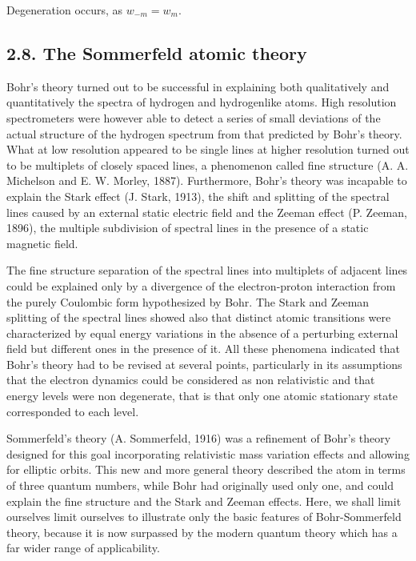 \documentclass{article}
\begin{document}
Degeneration occurs, as $w_{-m}=w_{m}$.

\subsection*{2.8. The Sommerfeld atomic theory}

Bohr's theory turned out to be successful in explaining both qualitatively and quantitatively the spectra of hydrogen and hydrogenlike atoms. High resolution spectrometers were however able to detect a series of small deviations of the actual structure of the hydrogen spectrum from that predicted by Bohr's theory. What at low resolution appeared to be single lines at higher resolution turned out to be multiplets of closely spaced lines, a phenomenon called fine structure (A. A. Michelson and E. W. Morley, 1887). Furthermore, Bohr's theory was incapable to explain the Stark effect (J. Stark, 1913), the shift and splitting of the spectral lines caused by an external static electric field and the Zeeman effect (P. Zeeman, 1896), the multiple subdivision of spectral lines in the presence of a static magnetic field.

The fine structure separation of the spectral lines into multiplets of adjacent lines could be explained only by a divergence of the electron-proton interaction from the purely Coulombic form hypothesized by Bohr. The Stark and Zeeman splitting of the spectral lines showed also that distinct atomic transitions were characterized by equal energy variations in the absence of a perturbing external field but different ones in the presence of it. All these phenomena indicated that Bohr's theory had to be revised at several points, particularly in its assumptions that the electron dynamics could be considered as non relativistic and that energy levels were non degenerate, that is that only one atomic stationary state corresponded to each level.

Sommerfeld's theory (A. Sommerfeld, 1916) was a refinement of Bohr's theory designed for this goal incorporating relativistic mass variation effects and allowing for elliptic orbits. This new and more general theory described the atom in terms of three quantum numbers, while Bohr had originally used only one, and could explain the fine structure and the Stark and Zeeman effects. Here, we shall limit
ourselves limit ourselves to illustrate only the basic features of Bohr-Sommerfeld theory, because it is now surpassed by the modern quantum theory which has a far wider range of applicability.
\end{document}
